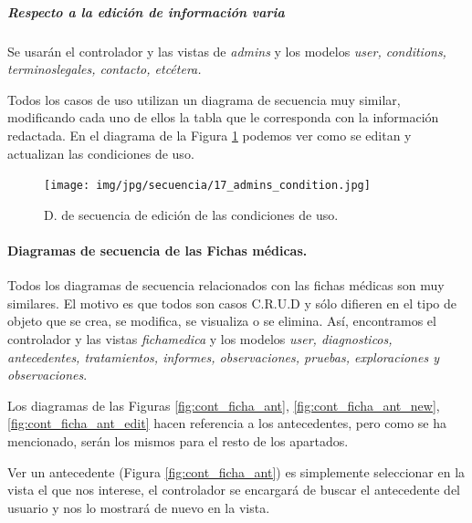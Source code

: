 \documentclass[a4paper,oneside,11pt]{book}
\begin{document}
			
				\subparagraph{Respecto a la edición de información varia} %
				\label{subp:cont_respecto_a_la_edicion_de_informacion_varia}
				
					Se usarán el controlador y las vistas de \textit{admins} y los modelos \textit{user, conditions, terminoslegales, contacto, etcétera.}
					
					Todos los casos de uso utilizan un diagrama de secuencia muy similar, modificando cada uno de ellos la tabla que le corresponda con la información redactada. En el diagrama de la Figura \ref{fig:cont_admin_condition} podemos ver como se editan y actualizan las condiciones de uso.
					
					\begin{figure}[H]
					  \centering
					    \texttt{[image: img/jpg/secuencia/17\_admins\_condition.jpg]}
					  \caption{D. de secuencia de edición de las condiciones de uso.}
					  \label{fig:cont_admin_condition}
					\end{figure}
				
				


			\paragraph{Diagramas de secuencia de las Fichas médicas.} %
			\label{par:diagramas_de_secuencia_de_las_fichas_medicas}
			
				Todos los diagramas de secuencia relacionados con las fichas médicas son muy similares. El motivo es que todos son casos C.R.U.D y sólo difieren en el tipo de objeto que se crea, se modifica, se visualiza o se elimina. Así, encontramos el controlador y las vistas \textit{fichamedica} y los modelos \textit{user, diagnosticos, antecedentes, tratamientos, informes, observaciones, pruebas, exploraciones y observaciones}.
				
				Los diagramas de las Figuras \ref{fig:cont_ficha_ant}, \ref{fig:cont_ficha_ant_new}, \ref{fig:cont_ficha_ant_edit} hacen referencia a los antecedentes, pero como se ha mencionado, serán los mismos para el resto de los apartados.
				
				Ver un antecedente (Figura \ref{fig:cont_ficha_ant}) es simplemente seleccionar en la vista el que nos interese, el controlador se encargará de buscar el antecedente del usuario y nos lo mostrará de nuevo en la vista.
				
\end{document}
